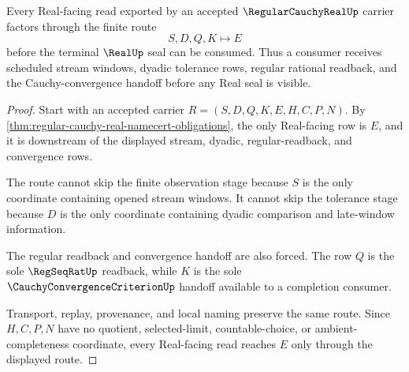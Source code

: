 \begin{theorem}
\label{thm:regular-cauchy-real-seal-route}
Every Real-facing read exported by an accepted $\RegularCauchyRealUp$ carrier factors through the finite route
$$
S,D,Q,K \longmapsto E
$$
before the terminal $\RealUp$ seal can be consumed. Thus a consumer receives scheduled stream windows, dyadic tolerance rows, regular rational readback, and the Cauchy-convergence handoff before any Real seal is visible.
\end{theorem}
\begin{proof}
Start with an accepted carrier $R=(S,D,Q,K,E,H,C,P,N)$. By \autoref{thm:regular-cauchy-real-namecert-obligations}, the only Real-facing row is $E$, and it is downstream of the displayed stream, dyadic, regular-readback, and convergence rows.

The route cannot skip the finite observation stage because $S$ is the only coordinate containing opened stream windows. It cannot skip the tolerance stage because $D$ is the only coordinate containing dyadic comparison and late-window information.

The regular readback and convergence handoff are also forced. The row $Q$ is the sole $\RegSeqRatUp$ readback, while $K$ is the sole $\CauchyConvergenceCriterionUp$ handoff available to a completion consumer.

Transport, replay, provenance, and local naming preserve the same route. Since $H,C,P,N$ have no quotient, selected-limit, countable-choice, or ambient-completeness coordinate, every Real-facing read reaches $E$ only through the displayed route.
\end{proof}

